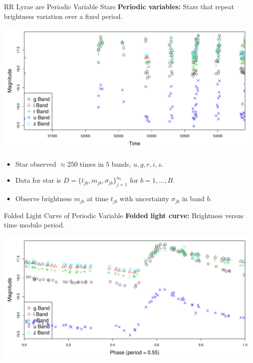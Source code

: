 \documentclass[12pt]{beamer}
\begin{document}
\begin{frame}{RR Lyrae are Periodic Variable Stars}
\textbf{Periodic variables:} Stars that repeat brightness variation over a fixed period.
\begin{center}
\includegraphics[scale=.3]{figs/unfolded_13350.pdf}
\end{center}
\begin{itemize}
\item Star observed $\approx 250$ times in $5$ bands, $u,g,r,i,z$.
\item Data for star is $D=\{t_{jb},m_{jb},\sigma_{jb}\}_{j=1}^{n_b}$ for $b=1,\ldots,B$.
\item Observe brightness $m_{jb}$ at time $t_{jb}$ with uncertainty $\sigma_{jb}$ in band $b$.
\end{itemize}
\end{frame}


\begin{frame}{Folded Light Curve of Periodic Variable}
\textbf{Folded light curve:} Brightness versus time modulo period.
\begin{center}
\includegraphics[scale=.3]{figs/folded_13350.pdf}
\end{center}
\end{frame}
\end{document}
